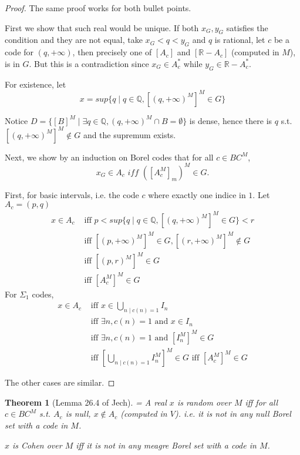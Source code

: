 \documentclass{article}
\newtheorem{theorem}{Theorem}
\begin{document}
\begin{proof}
    The same proof works for both bullet points.

    First we show that such real would be unique. If both $x_G,y_G$ satisfies the condition and they are not equal, take $x_G<q<y_G $ and $q$ is rational, let $c$ be a code for $(q,+\infty)$, then precisely one of $[A_c]$ and $[\mathbb{R} - A_c]$ (computed in $M$), is in $G$. But this is a contradiction since $x_G\in A_c^*$ while $y_G\in \mathbb{R} - A_c^*$.

    For existence, let $$x = sup\{q\mid q \in \mathbb{Q}, [(q,+\infty)^M]^M\in G\}$$

    Notice $D = \{[B]^M\mid \exists q\in \mathbb{Q}, (q,+\infty)^M\cap B = \emptyset\} $ is dense, hence there is $q$ s.t. $[(q,+\infty)^M]^M\not\in G$ and the supremum exists. 

    Next, we show by an induction on Borel codes that for all $c\in BC^M$, $$x_G\in A_c \textit{ iff }([A_c^M]_m)^M\in G.$$

    First, for basic intervals, i.e. the code $c$ where exactly one indice in $1$. Let $A_c = (p,q)$
    \begin{align}
        x\in A_c &\text{ iff }p<sup\{q\mid q \in \mathbb{Q}, [(q,+\infty)^M]^M\in G\}<r \\
        &\text{ iff } [(p,+\infty)^M]^M\in G, [(r,+\infty)^M]^M\not\in G \\
        &\text{ iff } [(p,r)^M]^M\in G \\
        & \text{ iff }[A_c^M]^M\in G
    \end{align}
    For $\Sigma_1$ codes, \begin{align}
        x\in A_c &\text{ iff } x\in \bigcup_{n\mid c(n) = 1}I_{n}\\
        &\text{ iff } \exists n, c(n) = 1\text{ and }x\in I_n  \\
        &\text{ iff }  \exists n, c(n) = 1 \text{ and }[I_n^M]^M \in G \\
        &\text{ iff } [\bigcup_{n\mid c(n) = 1}I_{n}^M]^M\in G \text{ iff }[A_c^M]^M\in G
    \end{align}

    The other cases are similar.
\end{proof}

\begin{theorem}[Lemma 26.4 of Jech]\label{thm:random-Cohen}
=    A real $x$ is random over $M$ iff for all $c\in BC^M$ s.t. $A_c$ is null, $x\not\in A_c$ (computed in $V$). i.e. it is not in any null Borel set with a code in $M$.
    
    $x$ is Cohen over $M$ iff it is not in any meagre Borel set with a code in $M$.
\end{theorem}
\end{document}
